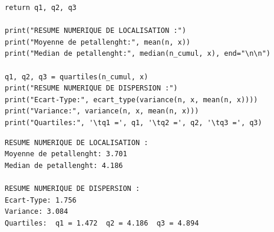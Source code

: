 \begin{enumerate}
\begin{lstlisting}[style=myPython, caption=Code python pour le résumé numérique, frame=lines]
    return q1, q2, q3

print("RESUME NUMERIQUE DE LOCALISATION :")
print("Moyenne de petallenght:", mean(n, x))
print("Median de petallenght:", median(n_cumul, x), end="\n\n")

q1, q2, q3 = quartiles(n_cumul, x)
print("RESUME NUMERIQUE DE DISPERSION :")
print("Ecart-Type:", ecart_type(variance(n, x, mean(n, x))))
print("Variance:", variance(n, x, mean(n, x)))
print("Quartiles:", '\tq1 =', q1, '\tq2 =', q2, '\tq3 =', q3)
\end{lstlisting}

\begin{lstlisting}[style=myLog, caption=Résultat numérique du code python, frame=lines]
RESUME NUMERIQUE DE LOCALISATION :
Moyenne de petallenght: 3.701
Median de petallenght: 4.186

RESUME NUMERIQUE DE DISPERSION :
Ecart-Type: 1.756
Variance: 3.084
Quartiles: 	q1 = 1.472 	q2 = 4.186 	q3 = 4.894
\end{lstlisting}


\end{enumerate}







